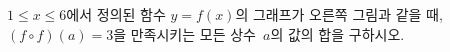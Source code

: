 \noindent\begin{minipage}[t]{0.58\linewidth}\vspace{0pt}\raggedright $1\le x\le 6$에서 정의된 함수 $y=f(x)$의 그래프가 오른쪽 그림과 같을 때, $(f\circ f)(a)=3$을 만족시키는 모든 상수~$a$의 값의 합을 구하시오.\end{minipage}\hfill\begin{minipage}[t]{0.4\linewidth}\vspace{0pt}\centering \resizebox{\ifdim\width>\linewidth\linewidth\else\width\fi}{!}{}\end{minipage}\par
